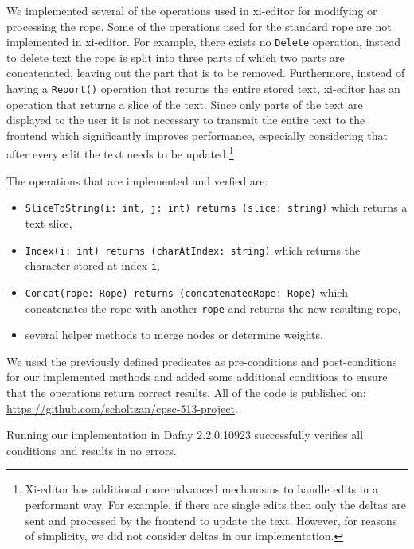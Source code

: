We implemented several of the operations used in xi-editor for modifying or processing the rope.
Some of the operations used for the standard rope are not implemented in xi-editor. 
For example, there exists no \texttt{Delete} operation, instead to delete text the rope is split into three parts of which two parts are concatenated, leaving out the part that is to be removed.
Furthermore, instead of having a \texttt{Report()} operation that returns the entire stored text, xi-editor has an operation that returns a slice of the text.
Since only parts of the text are displayed to the user it is not necessary to transmit the entire text to the frontend which significantly improves performance, especially considering that after every edit the text needs to be updated.\footnote{Xi-editor has additional more advanced mechanisms to handle edits in a performant way. For example, if there are single edits then only the deltas are sent and processed by the frontend to update the text. However, for reasons of simplicity, we did not consider deltas in our implementation.}

The operations that are implemented and verfied are:
\begin{itemize} 
  \item \texttt{SliceToString(i: int, j: int) returns (slice: string)} which returns a text slice,
  \item \texttt{Index(i: int) returns (charAtIndex: string)} which returns the character stored at index \texttt{i},
  \item \texttt{Concat(rope: Rope) returns (concatenatedRope: Rope)} which concatenates the rope with another \texttt{rope} and returns the new resulting rope,
  \item several helper methods to merge nodes or determine weights.
\end{itemize}


We used the previously defined predicates as pre-conditions and post-conditions for our implemented methods and added some additional conditions to ensure that the operations return correct results.
All of the code is published on: \url{https://github.com/scholtzan/cpsc-513-project}.

Running our implementation in Dafny 2.2.0.10923 successfully verifies all conditions and results in no errors.


  

